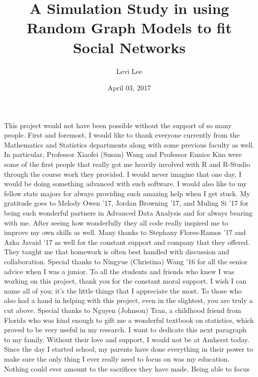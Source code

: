 \documentclass[12pt,twoside]{amherstthesis}
\title{A Simulation Study in using Random Graph Models to fit Social Networks}
\author{Levi Lee}
\date{April 03, 2017}
\begin{document}
      \maketitle
  
  \frontmatter %
  \pagestyle{empty} %

      \begin{acknowledgements}
      This project would not have been possible without the support of so many
      people. First and foremost, I would like to thank everyone currently
      from the Mathematics and Statistics departments along with some previous
      faculty as well. In particular, Professor Xiaofei (Susan) Wang and
      Professor Eunice Kim were some of the first people that really got me
      heavily involved with R and R-Studio through the course work they
      provided. I would never imagine that one day, I would be doing something
      advanced with such software. I would also like to my fellow stats majors
      for always providing such amazing help when I get stuck. My gratitude
      goes to Melody Owen '17, Jordan Browning '17, and Muling Si '17 for
      being such wonderful partners in Advanced Data Analysis and for always
      bearing with me. After seeing how wonderfully they all code really
      inspired me to improve my own skills as well. Many thanks to Stephany
      Flores-Ramos '17 and Azka Javaid '17 as well for the constant support
      and company that they offered. They taught me that homework is often
      best handled with discussion and collaboration. Special thanks to
      Ningyue (Christina) Wang '16 for all the senior advice when I was a
      junior. To all the students and friends who knew I was working on this
      project, thank you for the constant moral support. I wish I can name all
      of you; it's the little things that I appreciate the most. To those who
      also had a hand in helping with this project, even in the slightest, you
      are truly a cut above. Special thanks to Nguyen (Johnson) Tran, a
      childhood friend from Florida who was kind enough to gift me a wonderful
      textbook on statistics, which proved to be very useful in my research. I
      want to dedicate this next paragraph to my family. Without their love
      and support, I would not be at Amherst today. Since the day I started
      school, my parents have done everything in their power to make sure the
      only thing I ever really need to focus on was my education. Nothing
      could ever amount to the sacrifices they have made. Being able to focus

\end{acknowledgements}
\end{document}
